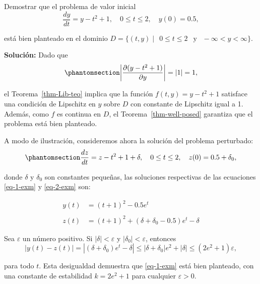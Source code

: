 \documentclass[
  spanish,
  us-letterpaper,
]{scrreprt}
\theoremstyle{definition}
\theoremstyle{plain}
\theoremstyle{remark}
\begin{document}
\begin{tcolorbox}[enhanced jigsaw, title={Ejemplo}, left=2mm, leftrule=.75mm, coltitle=black, opacityback=0, colback=white, titlerule=0mm, toprule=.15mm, opacitybacktitle=0.6, colframe=quarto-callout-caution-color-frame, bottomtitle=1mm, colbacktitle=quarto-callout-caution-color!10!white, rightrule=.15mm, arc=.35mm, breakable, toptitle=1mm, bottomrule=.15mm]

Demostrar que el problema de valor inicial\\
\[
\frac{dy}{dt} = y - t^2 + 1, \quad 0 \leq t \leq 2, \quad y(0) = 0.5,
\]

está bien planteado en el dominio
\(D = \{(t, y) \mid \ \ 0 \leq t \leq 2 \ \ \text{ y } \ \ -\infty < y < \infty \}\).

\textbf{Solución:} Dado que\\
\begin{equation}\phantomsection\label{eq-1-exm}{
\left| \frac{\partial (y - t^2 + 1)}{\partial y} \right| = |1| = 1,
}\end{equation}

el Teorema~\ref{thm-Lib-teo} implica que la función
\(f(t, y) = y - t^2 + 1\) satisface una condición de Lipschitz en \(y\)
sobre \(D\) con constante de Lipschitz igual a 1. Además, como \(f\) es
continua en \(D\), el Teorema~\ref{thm-well-posed} garantiza que el
problema está bien planteado.

A modo de ilustración, consideremos ahora la solución del problema
perturbado:\\
\begin{equation}\phantomsection\label{eq-2-exm}{
\frac{dz}{dt} = z - t^2 + 1 + \delta, \quad 0 \leq t \leq 2, \quad z(0) = 0.5 + \delta_0,
}\end{equation}

donde \(\delta\) y \(\delta_0\) son constantes pequeñas, las soluciones
respectivas de las ecuaciones \ref{eq-1-exm} y \ref{eq-2-exm} son:

\begin{align*}
y(t) &= (t + 1)^2 - 0.5e^t \\ \\
z(t) &= (t + 1)^2 + (\delta + \delta_0 - 0.5)e^t - \delta
\end{align*}

Sea \(\varepsilon\) un número positivo. Si \(|\delta| < \varepsilon\) y
\(|\delta_0| < \varepsilon\), entonces \[
|y(t) - z(t)| = |(\delta + \delta_0)e^t - \delta| \leq |\delta + \delta_0|e^2 + |\delta| \leq (2e^2 + 1)\varepsilon,
\]

para todo \(t\). Esta desigualdad demuestra que \ref{eq-1-exm} está bien
planteado, con una constante de estabilidad \(k = 2e^2 + 1\) para
cualquier \(\varepsilon > 0\).

\end{tcolorbox}
\end{document}
